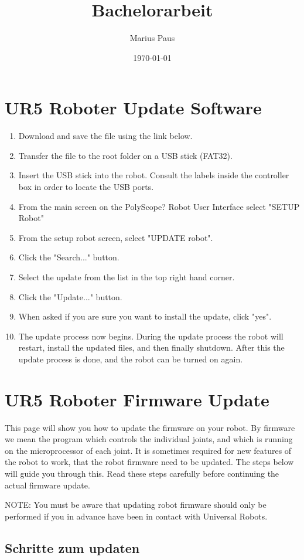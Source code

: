 \documentclass[
a4paper,
12pt,
oneside,
headsepline,		%
footsepline,		%
]{scrbook}
\title{Bachelorarbeit}
\author{Marius Paus}
\date{\today}
\begin{document}
\chapter{UR5 Roboter Update Software}
\begin{enumerate}
	\item Download and save the file using the link below.
    \item Transfer the file to the root folder on a USB stick (FAT32).
    \item Insert the USB stick into the robot. Consult the labels inside the controller box in order to locate the USB ports.
    \item From the main screen on the PolyScope? Robot User Interface select "SETUP Robot"
    \item From the setup robot screen, select "UPDATE robot".
    \item Click the "Search..." button.
    \item Select the update from the list in the top right hand corner.
    \item Click the "Update..." button.
    \item When asked if you are sure you want to install the update, click "yes".
    \item The update process now begins. During the update process the robot will restart, install the updated files, and then finally shutdown. After this the update process is done, and the robot can be turned on again. 
\end{enumerate}


\chapter{UR5 Roboter Firmware Update}


This page will show you how to update the firmware on your robot. By firmware we mean the program which controls the individual joints, and which is running on the microprocessor of each joint. It is sometimes required for new features of the robot to work, that the robot firmware need to be updated. The steps below will guide you through this. Read these steps carefully before continuing the actual firmware update.

NOTE: You must be aware that updating robot firmware should only be performed if you in advance have been in contact with Universal Robots. 
\section{Schritte zum updaten}
\label{update_steps}
\end{document}

